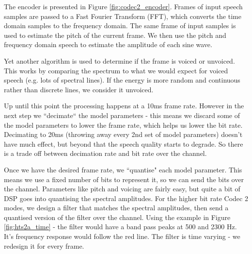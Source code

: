 \documentclass{article}
\begin{document}
{\begin{figure}[h]
\begin{center}
\end{center}
\end{figure}

The encoder is presented in Figure \ref{fig:codec2_encoder}.  Frames of input speech samples are passed to a Fast Fourier Transform (FFT), which converts the time domain samples to the frequency domain.  The same frame of input samples is used to estimate the pitch of the current frame. We then use the pitch and frequency domain speech to estimate the amplitude of each sine wave.

Yet another algorithm is used to determine if the frame is voiced or unvoiced.  This works by comparing the spectrum to what we would expect for voiced speech (e.g. lots of spectral lines).  If the energy is more random and continuous rather than discrete lines, we consider it unvoiced.

Up until this point the processing happens at a 10ms frame rate.  However in the next step we ``decimate`` the model parameters - this means we discard some of the model parameters to lower the frame rate, which helps us lower the bit rate.  Decimating to 20ms (throwing away every 2nd set of model parameters) doesn't have much effect, but beyond that the speech quality starts to degrade.  So there is a trade off between decimation rate and bit rate over the channel.

Once we have the desired frame rate, we ``quantise" each model parameter.  This means we use a fixed number of bits to represent it, so we can send the bits over the channel.  Parameters like pitch and voicing are fairly easy, but quite a bit of DSP goes into quantising the spectral amplitudes. For the higher bit rate Codec 2 modes, we design a filter that matches the spectral amplitudes, then send a quantised version of the filter over the channel. Using the example in Figure \ref{fig:hts2a_time} - the filter would have a band pass peaks at 500 and 2300 Hz.  It's frequency response would follow the red line. The filter is time varying - we redesign it for every frame.

}
\end{document}
